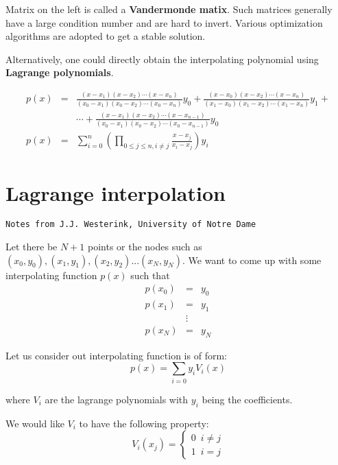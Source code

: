 \documentclass[11pt,titlepage,fleqn]{article}
\begin{document}
Matrix on the left is called a {\bf Vandermonde matix}. Such matrices generally have a large condition number and are hard to invert. Various optimization algorithms are adopted to get a stable solution.

Alternatively, one could directly obtain the interpolating polynomial using {\bf Lagrange polynomials}.

\begin{eqnarray}
p(x) &=& \frac{(x - x_1)(x - x_2)\cdots(x-x_n)}{(x_0 - x_1)(x_0 - x_2)\cdots(x_0-x_n)} y_0 + \frac{(x - x_0)(x - x_2)\cdots(x-x_n)}{(x_1 - x_0)(x_1 - x_2)\cdots(x_1-x_n)} y_1 +\\
&& \cdots +  \frac{(x - x_1)(x - x_2)\cdots(x-x_{n-1})}{(x_0 - x_1)(x_0 - x_2)\cdots(x_0-x_{n-1})} y_0\\
p(x) &=& \sum_{i=0}^n \left (\prod_{0\leq j\leq n, i\neq j} \frac{x-x_j}{x_i -x _j} \right ) y_i
\end{eqnarray}

\section{Lagrange interpolation}
\verb+Notes from J.J. Westerink, University of Notre Dame+

Let there be $N+1$ points or the nodes such as $(x_0,y_0), (x_1,y_1), (x_2,y_2)... (x_N,y_N)$. We want to come up with some interpolating function $p(x)$ such that
\begin{eqnarray*}
p(x_0) &=& y_0 \\
p(x_1) &=& y_1 \\
&\vdots& \\
p(x_N) &=& y_N 
\end{eqnarray*}

Let us consider out interpolating function is of form:
\begin{equation}
p(x) = \sum_{i=0} y_i V_i(x)
\end{equation}

where $V_i$ are the lagrange polynomials with $y_i$ being the coefficients.

We would like $V_i$ to have the following property:
\begin{equation}
V_i(x_j) =  \begin{cases}
0 \,\,\, i\neq j\\
1 \,\,\, i=j
\end{cases} \label{eq:lagrange_cases}
\end{equation}
\end{document}
